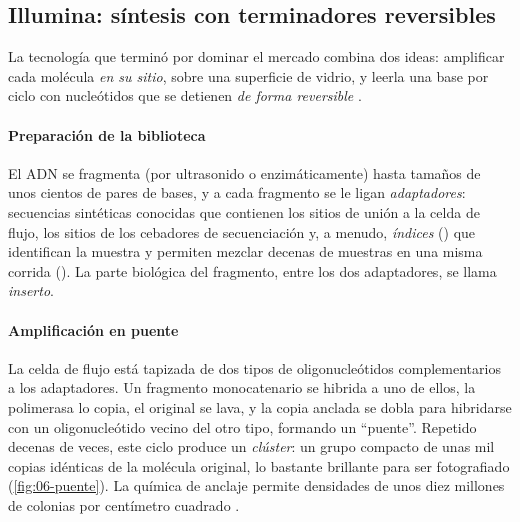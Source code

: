 \subsection{Illumina: síntesis con terminadores reversibles}

La tecnología que terminó por dominar el mercado combina dos ideas: amplificar cada molécula \emph{en su sitio}, sobre una superficie de vidrio, y leerla una base por ciclo con nucleótidos que se detienen \emph{de forma reversible} \parencite{c06-bentley2008}.

\paragraph{Preparación de la biblioteca} El ADN se fragmenta (por ultrasonido o enzimáticamente) hasta tamaños de unos cientos de pares de bases, y a cada fragmento se le ligan \emph{adaptadores}: secuencias sintéticas conocidas que contienen los sitios de unión a la celda de flujo, los sitios de los cebadores de secuenciación y, a menudo, \emph{índices} () que identifican la muestra y permiten mezclar decenas de muestras en una misma corrida (). La parte biológica del fragmento, entre los dos adaptadores, se llama \emph{inserto}.

\paragraph{Amplificación en puente} La celda de flujo está tapizada de dos tipos de oligonucleótidos complementarios a los adaptadores. Un fragmento monocatenario se hibrida a uno de ellos, la polimerasa lo copia, el original se lava, y la copia anclada se dobla para hibridarse con un oligonucleótido vecino del otro tipo, formando un ``puente''. Repetido decenas de veces, este ciclo produce un \emph{clúster}: un grupo compacto de unas mil copias idénticas de la molécula original, lo bastante brillante para ser fotografiado (\cref{fig:06-puente}). La química de anclaje permite densidades de unos diez millones de colonias por centímetro cuadrado \parencite{c06-fedurco2006}.

